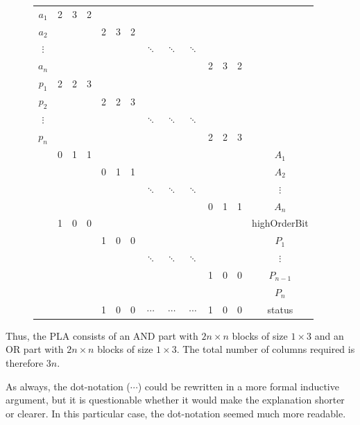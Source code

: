 \documentclass[10pt,a4paper]{scrartcl}
\begin{document}
\begin{figure}[H]
\centering\begin{tabular}{|c|ccc|ccc|ccc|ccc|c|}
  \hline
  $a_1$   &2&3&2& & & & & & & & & & \\
  $a_2$   & & & &2&3&2& & & & & & & \\
  $\vdots$& & & & & & &$\ddots$ &$\ddots$ &$\ddots$ & & & & \\
  $a_n$   & & & & & & & & & &2&3&2& \\
  \hline
  $p_1$   &2&2&3& & & & & & & & & & \\
  $p_2$   & & & &2&2&3& & & & & & & \\
  $\vdots$ & & & & & & &$\ddots$ &$\ddots$ &$\ddots$ & & & & \\
  $p_n$   & & & & & & & & & &2&2&3& \\
  \hline \hline
          &0&1&1& & & & & & & & & &$A_1$ \\
          & & & &0&1&1& & & & & & &$A_2$ \\
          & & & & & & &$\ddots$ &$\ddots$ &$\ddots$ & & & &$\vdots$\\
          & & & & & & & & & &0&1&1&$A_n$ \\
  \hline
          &1&0&0& & & & & & & & & & highOrderBit\\
  \hline
         & & & &1&0&0& & & & & & & $P_1$ \\
         & & & & & & &$\ddots$ &$\ddots$ &$\ddots$ & & & & $\vdots$ \\
         & & & & & & & & & &1&0&0& $P_{n-1}$ \\
         & & & & & & & & & & & & & $P_n$ \\
  \hline
         & & & &1&0&0&$\cdots$ & $\cdots$& $\cdots$&1 &0&0& status \\
  \hline

\end{tabular}
\end{figure}
Thus, the PLA consists of an AND part with $2n\times n$ blocks of size $1\times 3$ and an OR part with
$2n\times n$ blocks of size $1\times 3$. The total number of columns required is therefore $3n$.

As always, the dot-notation ($\cdots$) could be rewritten in a more formal inductive argument, 
but it is questionable whether it would make the explanation shorter or clearer. In this particular 
case, the dot-notation seemed much more readable.
\end{document}
